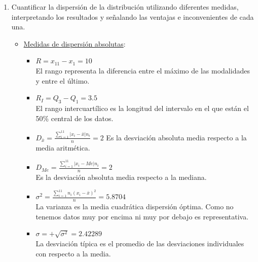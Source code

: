 \begin{ejercicio}
\begin{enumerate}
        \item Cuantificar la dispersión de la distribución utilizando diferentes medidas, interpretando los resultados y señalando las ventajas e inconvenientes de cada una.
        \begin{itemize}
            \item \underline{Medidas de dispersión absolutas}:
            \begin{itemize}
                \item $R=x_{11} - x_1 = 10$\\
                El rango representa la diferencia entre el máximo de las modalidades y entre el último.
                \item $R_I=Q_3 - Q_1 = 3.5$\\
                El rango intercuartílico es la longitud del intervalo en el que están el 50\% central de los datos.
                \item $D_{\bar{x}} = \frac{\sum_{i=1}^{11}|x_i-\bar{x}|n_i}{n} = 2$
                Es la desviación absoluta media respecto a la media aritmética.
                \item $D_{Me} = \frac{\sum_{i=1}^{11}|x_i-Me|n_i}{n} = 2$\\
                Es la desviación absoluta media respecto a la mediana. 
                \item $\sigma^2 = \frac{\sum_{i=1}^{11}n_i(x_i-\bar{x})^2}{n} = 5.8704$\\
                La varianza es la media cuadrática dispersión óptima.  Como no tenemos datos muy por encima ni muy por debajo es representativa. 
                \item $\sigma = +\sqrt{\sigma^2} = 2.42289$\\
                La desviación típica es el promedio de las desviaciones individuales  con respecto a la media.
            \end{itemize}


\end{itemize}
\end{enumerate}
\end{ejercicio}
